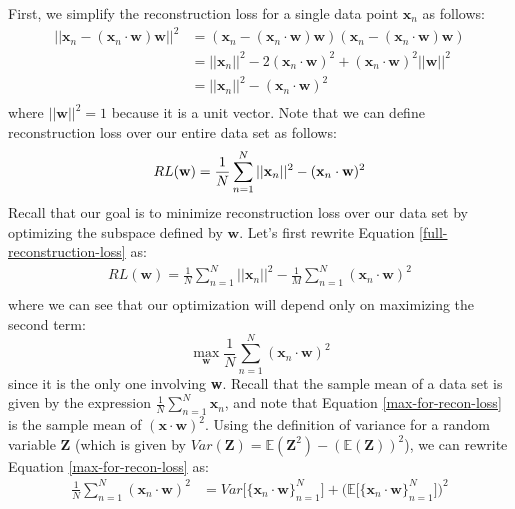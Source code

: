 First, we simplify the reconstruction loss for a single data point $\textbf{x}_n$ as follows:
\begin{align*}
	||\textbf{x}_{n} - (\textbf{x}_{n} \cdot \textbf{w})\textbf{w}||^{2} &= (\textbf{x}_{n} - (\textbf{x}_{n} \cdot \textbf{w})\textbf{w})(\textbf{x}_{n} - (\textbf{x}_{n} \cdot \textbf{w})\textbf{w}) \\
	&= ||\textbf{x}_{n}||^{2} - 2(\textbf{x}_{n} \cdot \textbf{w})^{2} + (\textbf{x}_{n} \cdot \textbf{w})^{2}||\textbf{w}||^{2} \\
	&= ||\textbf{x}_{n}||^{2} - (\textbf{x}_{n} \cdot \textbf{w})^{2} \\
\end{align*}
where $||\textbf{w}||^{2} = 1$ because it is a unit vector. Note that we can define reconstruction loss over our entire data set as follows:
\begin{equation} \label{full-reconstruction-loss}
    RL(\textbf{w}) = \frac{1}{N} \sum_{n=1}^{N} ||\textbf{x}_{n}||^{2} - (\textbf{x}_{n} \cdot \textbf{w})^{2} \\
\end{equation}
Recall that our goal is to minimize reconstruction loss over our data set by optimizing the subspace defined by $\textbf{w}$. Let's first rewrite Equation \ref{full-reconstruction-loss} as:
\begin{align*}
    RL(\textbf{w}) = \frac{1}{N} \sum_{n=1}^{N} ||\textbf{x}_{n}||^{2} - \frac{1}{M} \sum_{n=1}^{N} (\textbf{x}_{n} \cdot \textbf{w})^{2} \\
\end{align*}
where we can see that our optimization will depend only on maximizing the second term:
\begin{equation} \label{max-for-recon-loss}
    \max_{\textbf{w}} \frac{1}{N} \sum_{n=1}^{N} (\textbf{x}_{n} \cdot \textbf{w})^{2}
\end{equation}
since it is the only one involving \textbf{w}. Recall that the sample mean of a data set is given by the expression $\frac{1}{N} \sum_{n=1}^{N} \textbf{x}_{n}$, and note that Equation \ref{max-for-recon-loss} is the sample mean of $(\textbf{x} \cdot \textbf{w})^{2}$. Using the definition of variance for a random variable $\textbf{Z}$ (which is given by $Var(\textbf{Z}) = \mathbb{E}(\textbf{Z}^{2}) - (\mathbb{E}(\textbf{Z}))^{2}$), we can rewrite Equation \ref{max-for-recon-loss} as:
\begin{align*}
    \frac{1}{N} \sum_{n=1}^{N} (\textbf{x}_{n} \cdot \textbf{w})^{2} &= Var\big[\{\textbf{x}_{n} \cdot \textbf{w}\}_{n=1}^{N}\big] + \big( \mathbb{E} \big[\{\textbf{x}_{n} \cdot \textbf{w}\}_{n=1}^{N}\big] \big)^{2}
\end{align*}
